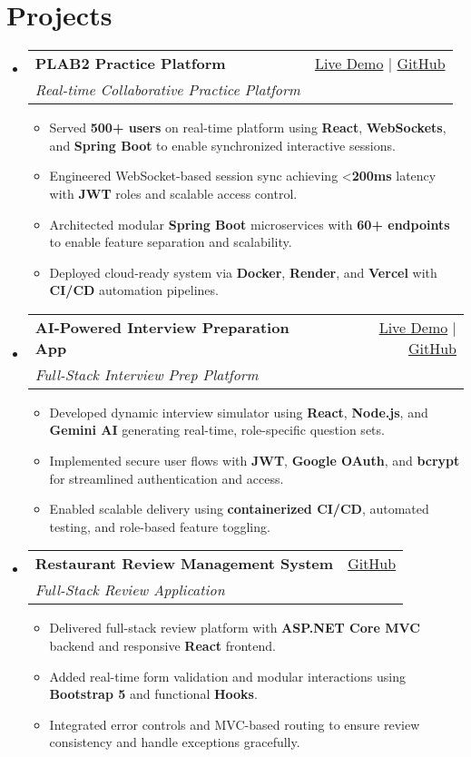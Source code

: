 \documentclass[letterpaper,11pt]{article}
\makeatletter
\newcommand{\resumeItem}[1]{\item\small{#1 \vspace{-2pt}}}
\newcommand{\resumeSubheading}[4]{
  \vspace{-1pt}\item
    \begin{tabular*}{0.97\textwidth}[t]{l@{\extracolsep{\fill}}r}
      \textbf{#1} & #2 \\
      \textit{\small#3} & \textit{\small #4} \\
    \end{tabular*}\vspace{-5pt}
}
\newcommand{\resumeSubHeadingListStart}{\begin{itemize}[leftmargin=*]}
\newcommand{\resumeSubHeadingListEnd}{\end{itemize}}
\newcommand{\resumeItemListStart}{\begin{itemize}}
\newcommand{\resumeItemListEnd}{\end{itemize}\vspace{-5pt}}
\makeatother
\begin{document}
\section{Projects}
  \resumeSubHeadingListStart
    \resumeSubheading
      {\textbf{PLAB2 Practice Platform}}{\href{https://plab2practice.com}{Live Demo} | \href{https://github.com/altansaid/plab2projectnew}{GitHub}}
      {Real-time Collaborative Practice Platform}{}
      \resumeItemListStart
        \resumeItem{Served \textbf{500+ users} on real-time platform using \textbf{React}, \textbf{WebSockets}, and \textbf{Spring Boot} to enable synchronized interactive sessions.}
        \resumeItem{Engineered WebSocket-based session sync achieving <\textbf{200ms} latency with \textbf{JWT} roles and scalable access control.}
        \resumeItem{Architected modular \textbf{Spring Boot} microservices with \textbf{60+ endpoints} to enable feature separation and scalability.}
        \resumeItem{Deployed cloud-ready system via \textbf{Docker}, \textbf{Render}, and \textbf{Vercel} with \textbf{CI/CD} automation pipelines.}
      \resumeItemListEnd

    \resumeSubheading
      {\textbf{AI-Powered Interview Preparation App}}{\href{https://interviewcoach-ai.vercel.app}{Live Demo} | \href{https://github.com/altansaid/interviewcoach-ai}{GitHub}}
      {Full-Stack Interview Prep Platform}{}
      \resumeItemListStart
        \resumeItem{Developed dynamic interview simulator using \textbf{React}, \textbf{Node.js}, and \textbf{Gemini AI} generating real-time, role-specific question sets.}
        \resumeItem{Implemented secure user flows with \textbf{JWT}, \textbf{Google OAuth}, and \textbf{bcrypt} for streamlined authentication and access.}
        \resumeItem{Enabled scalable delivery using \textbf{containerized CI/CD}, automated testing, and role-based feature toggling.}
      \resumeItemListEnd

    \resumeSubheading
      {\textbf{Restaurant Review Management System}}{\href{https://github.com/altansaid/restaurantreviewmanagementsystem}{GitHub}}
      {Full-Stack Review Application}{}
      \resumeItemListStart
        \resumeItem{Delivered full-stack review platform with \textbf{ASP.NET Core MVC} backend and responsive \textbf{React} frontend.}
        \resumeItem{Added real-time form validation and modular interactions using \textbf{Bootstrap 5} and functional \textbf{Hooks}.}
        \resumeItem{Integrated error controls and MVC-based routing to ensure review consistency and handle exceptions gracefully.}
      \resumeItemListEnd
  \resumeSubHeadingListEnd
\end{document}

